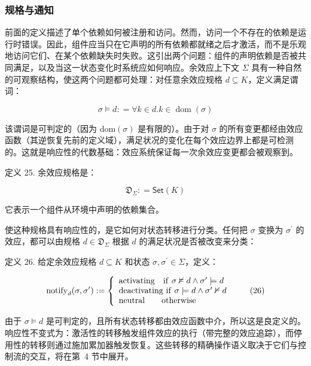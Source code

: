 \documentclass[
  10
]{article}
\begin{document}
\subsubsection{规格与通知} \label{specification-and-notification}

前面的定义描述了单个依赖如何被注册和访问。然而，访问一个不存在的依赖是运行时错误。因此，组件应当只在它声明的所有依赖都就绪之后才激活，而不是乐观地访问它们、在某个依赖缺失时失败。这引出两个问题：组件的声明依赖是否被共同满足，以及当这一状态变化时系统应如何响应。余效应上下文 \(\Sigma\) 具有一种自然的可观察结构，使这两个问题都可处理：对任意余效应规格 \(d \subseteq K\)，定义满足谓词：

\[
\sigma \models d : = \forall k \in d . k \in \operatorname { d o m } ( \sigma )\tag{24}
\]

该谓词是可判定的（因为 dom\(( \sigma )\) 是有限的）。由于对 \(\sigma\) 的所有变更都经由效应函数（其逆恢复先前的定义域），满足状况的变化在每个效应边界上都是可检测的。这就是响应性的代数基础：效应系统保证每一次余效应变更都会被观察到。

定义 25. 余效应规格是：

\[
{ \mathfrak { D } } _ { \Sigma } : = { \mathsf { S e t } } ( K )\tag{25}
\]

它表示一个组件从环境中声明的依赖集合。

使这种规格具有响应性的，是它如何对状态转移进行分类。任何把 \(\sigma\) 变换为 \(\sigma ^ { \prime }\) 的效应，都可以由规格 \(d \in \mathfrak { D } _ { \Sigma }\) 根据 \(d\) 的满足状况是否被改变来分类：

定义 26. 给定余效应规格 \(d \subseteq K\) 和状态 \(\sigma , \sigma ^ { \prime } \in \Sigma\)，定义：

\[
\mathrm { n o t i f y } _ { d } ( \sigma , \sigma ^ { \prime } ) : = \left\{ \begin{array} { l l } { \mathrm { a c t i v a t i n g } \quad \mathrm { i f } \ \sigma \nvDash d \land \sigma ^ { \prime } \models d } \\ { \mathrm { d e a c t i v a t i n g ~ i f } \ \sigma \models d \land \sigma ^ { \prime } \nvDash d } \\ { \mathrm { n e u t r a l } \quad \quad \mathrm { o t h e r w i s e } } \end{array} \right.\tag{26}
\]

由于 \(\sigma \models d\) 是可判定的，且所有状态转移都由效应函数中介，所以这是良定义的。响应性不变式为：激活性的转移触发组件效应的执行（带完整的效应追踪），而停用性的转移则通过施加累加器触发恢复。这些转移的精确操作语义取决于它们与控制流的交互，将在第~4 节中展开。
\end{document}
